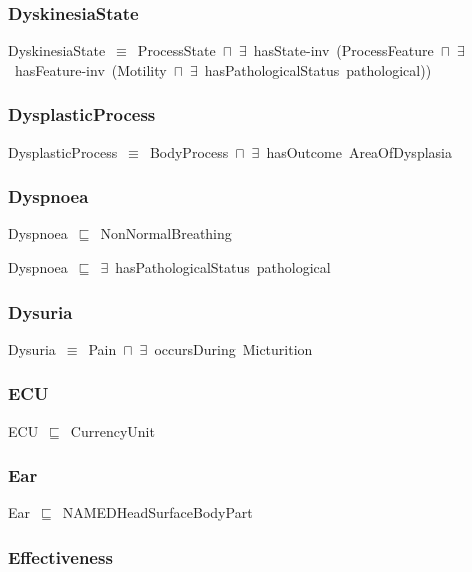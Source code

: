 \documentclass{article}
\begin{document}
\subsubsection*{DyskinesiaState}

DyskinesiaState~\ensuremath{\equiv}~ProcessState~\ensuremath{\sqcap}~\ensuremath{\exists}~hasState-inv~(ProcessFeature~\ensuremath{\sqcap}~\ensuremath{\exists}~hasFeature-inv~(Motility~\ensuremath{\sqcap}~\ensuremath{\exists}~hasPathologicalStatus~pathological))

\subsubsection*{DysplasticProcess}

DysplasticProcess~\ensuremath{\equiv}~BodyProcess~\ensuremath{\sqcap}~\ensuremath{\exists}~hasOutcome~AreaOfDysplasia

\subsubsection*{Dyspnoea}

Dyspnoea~\ensuremath{\sqsubseteq}~NonNormalBreathing~

Dyspnoea~\ensuremath{\sqsubseteq}~\ensuremath{\exists}~hasPathologicalStatus~pathological~

\subsubsection*{Dysuria}

Dysuria~\ensuremath{\equiv}~Pain~\ensuremath{\sqcap}~\ensuremath{\exists}~occursDuring~Micturition

\subsubsection*{ECU}

ECU~\ensuremath{\sqsubseteq}~CurrencyUnit~

\subsubsection*{Ear}

Ear~\ensuremath{\sqsubseteq}~NAMEDHeadSurfaceBodyPart~

\subsubsection*{Effectiveness}
\end{document}

